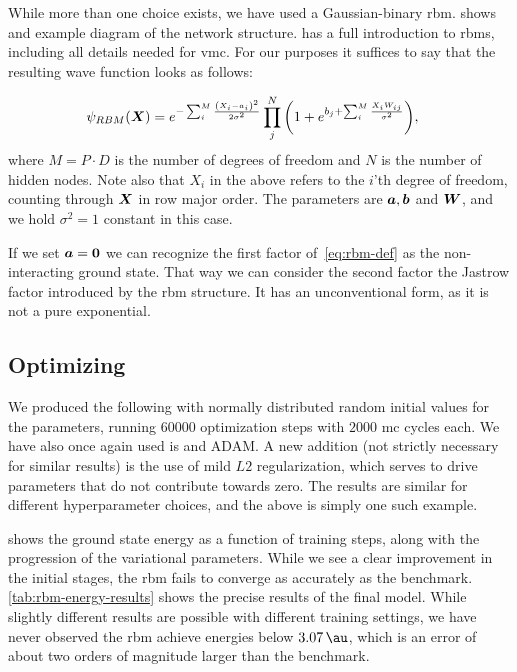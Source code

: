 \documentclass[Thesis.tex]{subfiles}
\begin{document}
While more than one choice exists, we have used a Gaussian-binary \gls{rbm}\@.
 shows and example diagram of the network
structure. \textcite{Flugsrud-2018} has a full introduction to \glspl{rbm}, including
all details needed for \gls{vmc}\@. For our purposes it suffices to say that the
resulting wave function looks as follows:

\begin{align}
  \label{eq:rbm-def}
  \psi_{RBM}(\bm{X}) &=
        e^{-\sum_i^{M} \frac{\qty(X_i-a_i)^2}{2\sigma^2}}
        \prod_j^N \qty(1 + e^{b_j+\sum_i^M \frac{X_iW_{ij}}{\sigma^2}}),
\end{align}
where $M = P\cdot D$ is the number of degrees of freedom and $N$ is the number
of hidden nodes. Note also that $X_i$ in the above refers to the $i$'th degree
of freedom, counting through $\bm{X}$ in row major order. The parameters are
$\bm{a}, \bm{b}$ and $\bm{W}$, and we hold $\sigma^2=1$ constant in this case.

If we set $\bm{a} = \bm{0}$ we can recognize the first factor of~\cref{eq:rbm-def}
as the non-interacting ground state. That way we can consider the second factor
the Jastrow factor introduced by the \gls{rbm} structure. It has an unconventional
form, as it is not a pure exponential.


\subsection{Optimizing}

We produced the following with normally distributed random
initial values for the parameters, running $\num{60000}$ optimization steps with
$\num{2000}$ \gls{mc} cycles each. We have also once again used \acrlong{is}
and ADAM\@. A new addition (not strictly necessary for similar results) is the use
of mild $L2$ regularization, which serves to drive parameters that do not
contribute towards zero. The results are similar for different hyperparameter
choices, and the above is simply one such example.

 shows the ground state energy as a function of
training steps, along with the progression of the variational
parameters. While we see a clear improvement in the initial stages, the \gls{rbm}
fails to converge as accurately as the benchmark. \cref{tab:rbm-energy-results}
shows the precise results of the final model. While slightly different results
are possible with different training settings, we have never observed the \gls{rbm}
achieve energies below $\SI{3.07}{\au}$, which is an error of about two orders
of magnitude larger than the benchmark.
\end{document}
